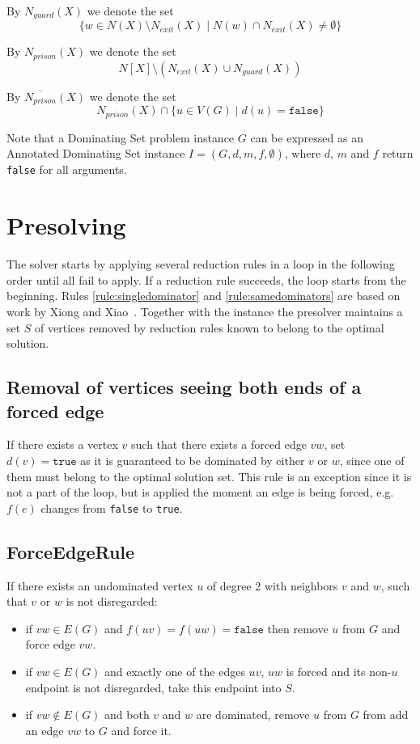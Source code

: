 \documentclass[a4paper,UKenglish,cleveref, autoref, thm-restate]{lipics-v2021}
\begin{document}
By $N_{guard}(X)$ we denote the set $$\{ w \in N(X) \setminus N_{exit}(X)\mid N(w) \cap N_{exit}(X) \neq \emptyset\}$$

By $N_{prison}(X)$ we denote the set $$N[X] \setminus (N_{exit}(X) \cup N_{guard}(X))$$

By $\overline{N_{prison}}(X)$ we denote the set $$N_{prison}(X) \cap \{u \in V(G) \mid d(u) = \texttt{false}\}$$

Note that a Dominating Set problem instance $G$ can be expressed as an Annotated Dominating Set instance $I = (G, d, m, f, \emptyset)$, where $d$, $m$ and $f$ return \texttt{false} for all arguments.

\section{Presolving}
The solver starts by applying several reduction rules in a loop in the following order until all fail to apply. If a reduction rule succeeds, the loop starts from the beginning.
Rules \ref{rule:singledominator} and \ref{rule:samedominators} are based on work by Xiong and Xiao~\cite{DBLP:conf/ijcai/Xiong024}.
Together with the instance the presolver maintains a set $S$ of vertices removed by reduction rules known to belong to the optimal solution.
\subsection{Removal of vertices seeing both ends of a forced edge}
If there exists a vertex $v$ such that there exists a forced edge $vw$, set $d(v) = \texttt{true}$ as it is guaranteed to be dominated by either $v$ or $w$, since one of them must belong to the optimal solution set.
This rule is an exception since it is not a part of the loop, but is applied the moment an edge is being forced, e.g. $f(e)$ changes from \texttt{false} to \texttt{true}.

\subsection{ForceEdgeRule}
If there exists an undominated vertex $u$ of degree 2 with neighbors $v$ and $w$, such that $v$ or $w$ is not disregarded:
\begin{itemize}
    \item if $vw \in E(G)$ and $f(uv) = f(uw) = \texttt{false}$ then remove $u$ from $G$ and force edge $vw$.
    \item if $vw \in E(G)$ and exactly one of the edges $uv$, $uw$ is forced and its non-$u$ endpoint is not disregarded, take this endpoint into $S$.
    \item if $vw \notin E(G)$ and both $v$ and $w$ are dominated, remove $u$ from $G$ from add an edge $vw$ to $G$ and force it.
\end{itemize}
\end{document}
